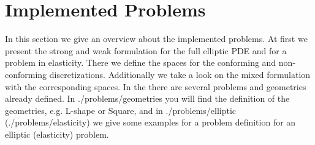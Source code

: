 \section{Implemented Problems}
\label{sect:ImplementedProblems}
In this section we give an overview about the implemented problems. At first we present the strong and weak formulation for the full elliptic PDE and for a problem in elasticity. There we define the spaces for the conforming and non-conforming discretizations. Additionally we take a look on the mixed formulation with the corresponding spaces. In the \FFW there are several problems and geometries already defined. In ./problems/geometries you will find the definition of the geometries, e.g. L-shape or Square, and in ./problems/elliptic (./problems/elasticity) we give some examples for a problem definition for an elliptic (elasticity) problem.





%
